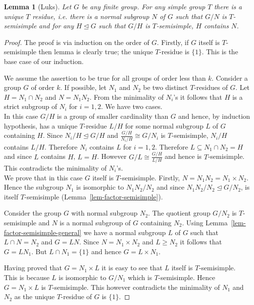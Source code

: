 \documentclass[11pt]{madras}%
\newtheorem{lemma}[theorem]{Lemma}
\theoremstyle{remark}
\begin{document}
\begin{lemma}[Luks]
\label{lem-unique-residue}
Let $G$ be any finite group. For any simple group $T$ there is a
unique $T$ residue, i.e. there is a normal subgroup $N$ of $G$ such
that $G/N$ is $T$-semisimple and for any $H \unlhd G$ such that $G/H$
is $T$-semisimple, $H$ contains $N$.
\end{lemma}
\begin{proof}
  The proof is via induction on the order of $G$. Firstly, if $G$
  itself is $T$-semisimple then lemma is clearly true; the unique
  $T$-residue is $\{ 1 \}$. This is the base case of our induction.

  We assume the assertion to be true for all groups of order less than
  $k$. Consider a group $G$ of order $k$.  If possible, let $N_1$ and
  $N_2$ be two distinct $T$-residues of $G$. Let $H = N_1 \cap N_2$
  and $N = N_1N_2$. From the minimality of $N_i$'s it follows that $H$
  is a strict subgroup of $N_i$ for $i= 1,2$.  We have two
  cases.\\

   In this case $G/H$ is a
  group of smaller cardinality than $G$ and hence, by induction
  hypothesis, has a unique $T$-residue $L/H$ for some normal subgroup
  $L$ of $G$ containing $H$. Since $N_i/H \unlhd G/H$ and
  $\frac{G/H}{N_i/H} \cong G/N_i$ is $T$-semisimple, $N_i/H$ contains
  $L/H$. Therefore $N_i$ contains $L$ for $i = 1,2$.  Therefore $L
  \subseteq N_1 \cap N_2 = H$ and since $L$ contains $H$, $L = H$.
  However $G/L \cong \frac{G/H}{L/H}$ and hence is
  $T$-semisimple.  This contradicts the minimality of $N_i$'s.\\

   We prove that in this case
  $G$ itself is $T$-semisimple. Firstly, $N = N_1 N_2 = N_1 \times
  N_2$. Hence the subgroup $N_1$ is isomorphic to $N_1 N_2/N_2$ and
  since $N_1N_2/N_2 \unlhd G/N_2$, is itself $T$-semisimple
  (Lemma~\ref{lem-factor-semisimple}).

  Consider the group $G$ with normal subgroup $N_2$. The quotient
  group $G/N_2$ is $T$-semisimple and $N$ is a normal subgroup of $G$
  containing $N_2$.  Using Lemma~\ref{lem-factor-semisimple-general}
  we have a normal subgroup $L$ of $G$ such that $L \cap N = N_2$ and
  $G = L N$. Since $N = N_1 \times N_2$ and $L \geq N_2$ it follows
  that $G = L N_1$. But $L \cap N_1 = \{ 1 \}$ and hence $G = L \times
  N_1$.

  Having proved that $G = N_1 \times L$ it is easy to see that $L$
  itself is $T$-semisimple.  This is because $L$ is isomorphic to
  $G/N_1$ which is $T$-semisimple. Hence $G = N_1 \times L$ is
  $T$-semisimple. This however contradicts the minimality of $N_1$ and
  $N_2$ as the unique $T$-residue of $G$ is $\{ 1 \}$.
\end{proof}
\end{document}
